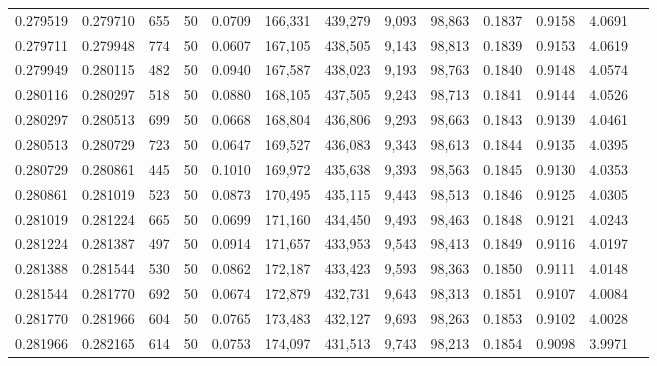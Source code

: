 \begin{tabular}{rrrrrrrrrrrrr}
0.279519 & 0.279710 &   655 &  50 &                                     0.0709 & 166,331 & 439,279 &   9,093 &  98,863 & 0.1837 & 0.9158 & 4.0691 \\
0.279711 & 0.279948 &   774 &  50 &                                     0.0607 & 167,105 & 438,505 &   9,143 &  98,813 & 0.1839 & 0.9153 & 4.0619 \\
0.279949 & 0.280115 &   482 &  50 &                                     0.0940 & 167,587 & 438,023 &   9,193 &  98,763 & 0.1840 & 0.9148 & 4.0574 \\
0.280116 & 0.280297 &   518 &  50 &                                     0.0880 & 168,105 & 437,505 &   9,243 &  98,713 & 0.1841 & 0.9144 & 4.0526 \\
0.280297 & 0.280513 &   699 &  50 &                                     0.0668 & 168,804 & 436,806 &   9,293 &  98,663 & 0.1843 & 0.9139 & 4.0461 \\
0.280513 & 0.280729 &   723 &  50 &                                     0.0647 & 169,527 & 436,083 &   9,343 &  98,613 & 0.1844 & 0.9135 & 4.0395 \\
0.280729 & 0.280861 &   445 &  50 &                                     0.1010 & 169,972 & 435,638 &   9,393 &  98,563 & 0.1845 & 0.9130 & 4.0353 \\
0.280861 & 0.281019 &   523 &  50 &                                     0.0873 & 170,495 & 435,115 &   9,443 &  98,513 & 0.1846 & 0.9125 & 4.0305 \\
0.281019 & 0.281224 &   665 &  50 &                                     0.0699 & 171,160 & 434,450 &   9,493 &  98,463 & 0.1848 & 0.9121 & 4.0243 \\
0.281224 & 0.281387 &   497 &  50 &                                     0.0914 & 171,657 & 433,953 &   9,543 &  98,413 & 0.1849 & 0.9116 & 4.0197 \\
0.281388 & 0.281544 &   530 &  50 &                                     0.0862 & 172,187 & 433,423 &   9,593 &  98,363 & 0.1850 & 0.9111 & 4.0148 \\
0.281544 & 0.281770 &   692 &  50 &                                     0.0674 & 172,879 & 432,731 &   9,643 &  98,313 & 0.1851 & 0.9107 & 4.0084 \\
0.281770 & 0.281966 &   604 &  50 &                                     0.0765 & 173,483 & 432,127 &   9,693 &  98,263 & 0.1853 & 0.9102 & 4.0028 \\
0.281966 & 0.282165 &   614 &  50 &                                     0.0753 & 174,097 & 431,513 &   9,743 &  98,213 & 0.1854 & 0.9098 & 3.9971 \\

\end{tabular}
